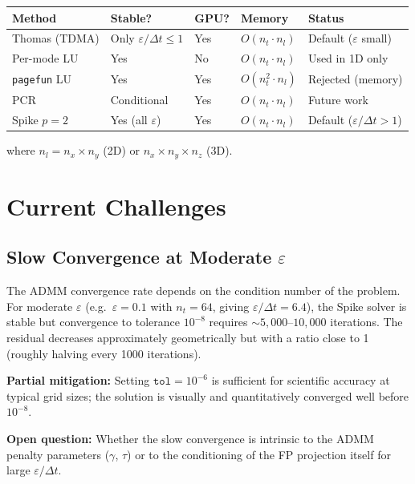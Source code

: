 \documentclass[11pt]{article}
\newcommand{\eps}{\varepsilon}
\newcommand{\dt}{\Delta t}
\begin{document}
\begin{center}
\renewcommand{\arraystretch}{1.4}
\begin{tabular}{lllll}
\toprule
\textbf{Method} & \textbf{Stable?} & \textbf{GPU?} & \textbf{Memory} & \textbf{Status} \\
\midrule
Thomas (TDMA)         & Only $\eps/\dt \leq 1$ & Yes & $O(n_t \cdot n_l)$    & Default ($\eps$ small) \\
Per-mode LU           & Yes                    & No  & $O(n_t \cdot n_l)$    & Used in 1D only \\
\texttt{pagefun} LU   & Yes                    & Yes & $O(n_t^2 \cdot n_l)$  & Rejected (memory) \\
PCR                   & Conditional            & Yes & $O(n_t \cdot n_l)$    & Future work \\
Spike $p=2$           & Yes (all $\eps$)        & Yes & $O(n_t \cdot n_l)$    & Default ($\eps/\dt > 1$) \\
\bottomrule
\end{tabular}
\end{center}
\noindent where $n_l = n_x \times n_y$ (2D) or $n_x \times n_y \times n_z$ (3D).

\section{Current Challenges}

\subsection{Slow Convergence at Moderate $\eps$}

The ADMM convergence rate depends on the condition number of the problem.
For moderate $\eps$ (e.g.\ $\eps = 0.1$ with $n_t = 64$, giving $\eps/\dt = 6.4$),
the Spike solver is stable but convergence to tolerance $10^{-8}$ requires
$\sim 5{,}000$--$10{,}000$ iterations.
The residual decreases approximately geometrically but with a ratio close to 1
(roughly halving every 1000 iterations).

\textbf{Partial mitigation:} Setting $\texttt{tol} = 10^{-6}$ is sufficient for
scientific accuracy at typical grid sizes; the solution is visually and
quantitatively converged well before $10^{-8}$.

\textbf{Open question:} Whether the slow convergence is intrinsic to the
ADMM penalty parameters ($\gamma$, $\tau$) or to the conditioning of the
FP projection itself for large $\eps/\dt$.
\end{document}

